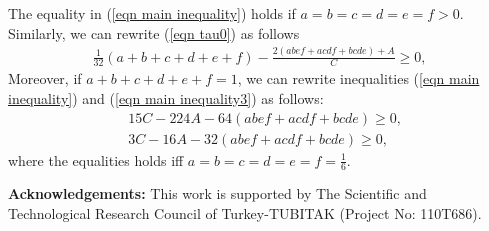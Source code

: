 \documentclass[12pt]{amsart}
\theoremstyle{example}
\theoremstyle{definition}
\theoremstyle{notation}
\begin{document}
The equality in (\ref{eqn main inequality}) holds if $a=b=c=d=e=f>0$. Similarly, we can rewrite (\ref{eqn tau0}) as follows
\begin{equation}\label{eqn main inequality3}
\begin{split}
\frac{1}{32}(a+b+c+d+e+f)-\frac{2(a b e f+a c d f+b c d e)+ A}{C} \geq 0,
\end{split}
\end{equation}
Moreover, if $a+b+c+d+e+f=1$, we can rewrite inequalities (\ref{eqn main inequality}) and (\ref{eqn main inequality3}) as follows:
\begin{equation}\label{eqn main inequality2}
\begin{split}
&15 C -224A-64(a b e f+a c d f+b c d e) \geq 0,\\
&3C-16A-32(a b e f+a c d f+b c d e) \geq 0,
\end{split}
\end{equation}
where the equalities holds iff $a=b=c=d=e=f=\frac{1}{6}.$

\textbf{Acknowledgements:} This work is supported by The Scientific and Technological Research Council of Turkey-TUBITAK (Project No: 110T686).
\end{document}
